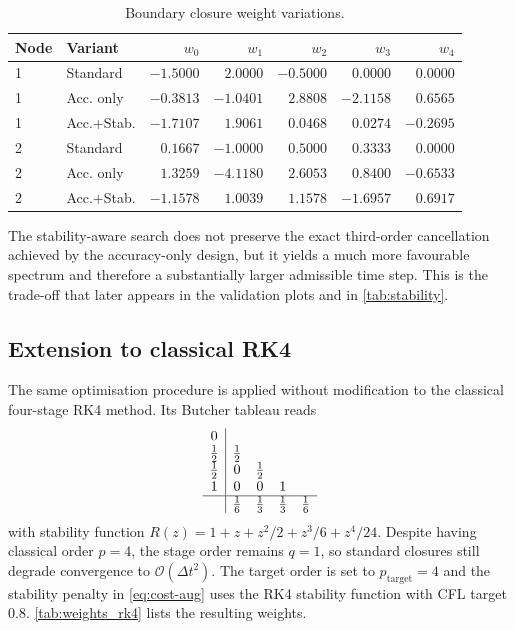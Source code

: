 \documentclass[review,hidelinks,onefignum,onetabnum]{siamart251216}
\newcommand{\Dt}{\Delta t}
\newcommand{\Order}[1]{\mathcal{O}\!\left(#1\right)}
\begin{document}
\begin{table}[tbhp]
\centering
\caption{Boundary closure weight variations.}
\label{tab:weights}
\begin{tabular}{llrrrrr}
\toprule
Node & Variant & $w_0$ & $w_1$ & $w_2$ & $w_3$ & $w_4$ \\
\midrule
1 & Standard        & $-1.5000$ & $2.0000$ & $-0.5000$ & $0.0000$ & $0.0000$ \\
1 & Acc. only       & $-0.3813$ & $-1.0401$ & $2.8808$ & $-2.1158$ & $0.6565$ \\
1 & Acc.+Stab.      & $-1.7107$ & $1.9061$ & $0.0468$ & $0.0274$ & $-0.2695$ \\
\midrule
2 & Standard        & $0.1667$ & $-1.0000$ & $0.5000$ & $0.3333$ & $0.0000$ \\
2 & Acc. only       & $1.3259$ & $-4.1180$ & $2.6053$ & $0.8400$ & $-0.6533$ \\
2 & Acc.+Stab.      & $-1.1578$ & $1.0039$ & $1.1578$ & $-1.6957$ & $0.6917$ \\
\bottomrule
\end{tabular}
\end{table}

The stability-aware search does not preserve the exact third-order cancellation achieved by the accuracy-only design, but it yields a much more favourable spectrum and therefore a substantially larger admissible time step. This is the trade-off that later appears in the validation plots and in \cref{tab:stability}.

\subsection{Extension to classical RK4}
\label{sec:rk4-optim}

The same optimisation procedure is applied without modification to the classical four-stage RK4 method. Its Butcher tableau reads
\begin{equation}
\begin{array}{c|cccc}
0 & & & & \\
\tfrac{1}{2} & \tfrac{1}{2} & & & \\
\tfrac{1}{2} & 0 & \tfrac{1}{2} & & \\
1 & 0 & 0 & 1 & \\
\hline
& \tfrac{1}{6} & \tfrac{1}{3} & \tfrac{1}{3} & \tfrac{1}{6}
\end{array}
\end{equation}
with stability function $R(z)=1+z+z^2/2+z^3/6+z^4/24$. Despite having classical order $p=4$, the stage order remains $q=1$, so standard closures still degrade convergence to $\Order{\Dt^2}$. The target order is set to $p_{\mathrm{target}}=4$ and the stability penalty in \eqref{eq:cost-aug} uses the RK4 stability function with CFL target $0.8$. \cref{tab:weights_rk4} lists the resulting weights.
\end{document}
